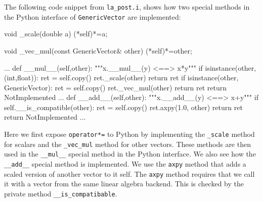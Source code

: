 The following code snippet from \texttt{la\_post.i}, shows how two special methods in the Python interface of \texttt{GenericVector} are implemented:
\begin{c++}
  void _scale(double a)
  {(*self)*=a;}

  void _vec_mul(const GenericVector& other)
  {(*self)*=other;}

   ...
    def __mul__(self,other):
        """x.__mul__(y) <==> x*y"""
        if isinstance(other,(int,float)):
            ret = self.copy()
            ret._scale(other)
            return ret
        if isinstance(other, GenericVector):
            ret = self.copy()
            ret._vec_mul(other)
            return ret
        return NotImplemented
    ...
    def __add__(self,other):
        """x.__add__(y) <==> x+y"""
        if self.__is_compatible(other):
            ret = self.copy()
            ret.axpy(1.0, other)
            return ret
        return NotImplemented
   ...
\end{c++}
Here we first expose \texttt{operator*=} to Python by implementing the \texttt{\_scale} method for scalars and the \texttt{\_vec\_mul} method for other vectors. These methods are then used in the \texttt{\_\_mul\_\_} special method in the Python interface. We also see how the \texttt{\_\_add\_\_} special method is implemented. We use the \texttt{axpy} method that adds a scaled version of another vector to it self. The \texttt{axpy} method requires that we call it with a vector from the same linear algebra backend. This is checked by the private method \texttt{\_\_is\_compatibable}.\par

